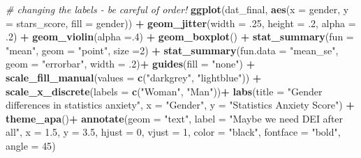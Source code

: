 \documentclass[
  oneside]{book}
\newenvironment{Shaded}{\begin{snugshade}}{\end{snugshade}}
\newcommand{\AttributeTok}[1]{\textcolor[rgb]{0.13,0.29,0.53}{#1}}
\newcommand{\CommentTok}[1]{\textcolor[rgb]{0.56,0.35,0.01}{\textit{#1}}}
\newcommand{\DecValTok}[1]{\textcolor[rgb]{0.00,0.00,0.81}{#1}}
\newcommand{\FloatTok}[1]{\textcolor[rgb]{0.00,0.00,0.81}{#1}}
\newcommand{\FunctionTok}[1]{\textcolor[rgb]{0.13,0.29,0.53}{\textbf{#1}}}
\newcommand{\NormalTok}[1]{#1}
\newcommand{\SpecialCharTok}[1]{\textcolor[rgb]{0.81,0.36,0.00}{\textbf{#1}}}
\newcommand{\StringTok}[1]{\textcolor[rgb]{0.31,0.60,0.02}{#1}}
\begin{document}
\begin{Shaded}
\begin{Highlighting}[]
\CommentTok{\# changing the labels {-} be careful of order!}
\FunctionTok{ggplot}\NormalTok{(dat\_final, }\FunctionTok{aes}\NormalTok{(}\AttributeTok{x =}\NormalTok{ gender, }\AttributeTok{y =}\NormalTok{ stars\_score, }\AttributeTok{fill =}\NormalTok{ gender)) }\SpecialCharTok{+}
  \FunctionTok{geom\_jitter}\NormalTok{(}\AttributeTok{width =}\NormalTok{ .}\DecValTok{25}\NormalTok{, }\AttributeTok{height =}\NormalTok{ .}\DecValTok{2}\NormalTok{, }\AttributeTok{alpha =}\NormalTok{ .}\DecValTok{2}\NormalTok{) }\SpecialCharTok{+}
  \FunctionTok{geom\_violin}\NormalTok{(}\AttributeTok{alpha =}\NormalTok{.}\DecValTok{4}\NormalTok{) }\SpecialCharTok{+}
  \FunctionTok{geom\_boxplot}\NormalTok{() }\SpecialCharTok{+}
  \FunctionTok{stat\_summary}\NormalTok{(}\AttributeTok{fun =} \StringTok{"mean"}\NormalTok{, }\AttributeTok{geom =} \StringTok{"point"}\NormalTok{, }\AttributeTok{size =}\DecValTok{2}\NormalTok{) }\SpecialCharTok{+}
  \FunctionTok{stat\_summary}\NormalTok{(}\AttributeTok{fun.data =} \StringTok{"mean\_se"}\NormalTok{, }\AttributeTok{geom =} \StringTok{"errorbar"}\NormalTok{, }\AttributeTok{width =}\NormalTok{ .}\DecValTok{2}\NormalTok{)}\SpecialCharTok{+}
  \FunctionTok{guides}\NormalTok{(}\AttributeTok{fill =} \StringTok{"none"}\NormalTok{) }\SpecialCharTok{+}
  \FunctionTok{scale\_fill\_manual}\NormalTok{(}\AttributeTok{values =} \FunctionTok{c}\NormalTok{(}\StringTok{"darkgrey"}\NormalTok{, }\StringTok{"lightblue"}\NormalTok{)) }\SpecialCharTok{+}
  \FunctionTok{scale\_x\_discrete}\NormalTok{(}\AttributeTok{labels =} \FunctionTok{c}\NormalTok{(}\StringTok{"Woman"}\NormalTok{, }\StringTok{"Man"}\NormalTok{))}\SpecialCharTok{+}
  \FunctionTok{labs}\NormalTok{(}\AttributeTok{title =} \StringTok{"Gender differences in statistics anxiety"}\NormalTok{,}
       \AttributeTok{x =} \StringTok{"Gender"}\NormalTok{,}
       \AttributeTok{y =} \StringTok{"Statistics Anxiety Score"}\NormalTok{) }\SpecialCharTok{+}
  \FunctionTok{theme\_apa}\NormalTok{()}\SpecialCharTok{+}
  \FunctionTok{annotate}\NormalTok{(}\AttributeTok{geom =} \StringTok{"text"}\NormalTok{,}
           \AttributeTok{label =} \StringTok{"Maybe we need DEI after all"}\NormalTok{,}
           \AttributeTok{x =} \FloatTok{1.5}\NormalTok{, }\AttributeTok{y =} \FloatTok{3.5}\NormalTok{,}
           \AttributeTok{hjust =} \DecValTok{0}\NormalTok{, }\AttributeTok{vjust =} \DecValTok{1}\NormalTok{, }
           \AttributeTok{color =} \StringTok{"black"}\NormalTok{, }\AttributeTok{fontface =} \StringTok{"bold"}\NormalTok{,}
           \AttributeTok{angle =} \DecValTok{45}\NormalTok{) }
\end{Highlighting}
\end{Shaded}
\end{document}

